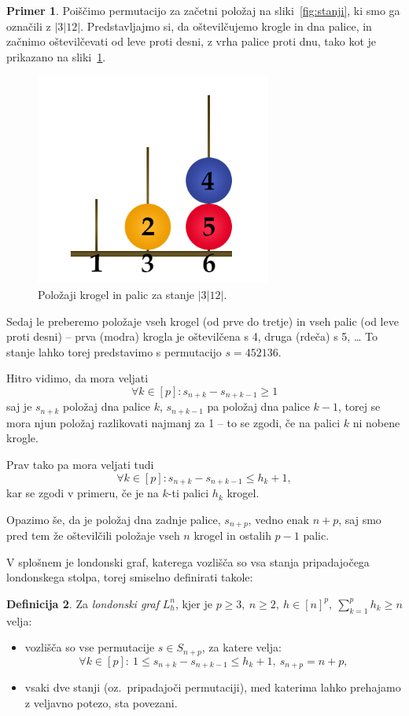 \documentclass[12pt,a4paper]{amsart}
\theoremstyle{definition} %
\newtheorem{definicija}{Definicija}[section]
\newtheorem{primer}[definicija]{Primer}
\theoremstyle{plain} %
\begin{document}
\begin{primer}
    Poiščimo permutacijo za začetni položaj na sliki~\ref{fig:stanji}, ki smo ga označili z $|3|12|$. 
    Predstavljajmo si, da oštevilčujemo krogle in dna palice, in začnimo oštevilčevati od leve proti desni, z vrha palice proti dnu, tako kot je prikazano na sliki~\ref{fig:ostev-stanji}.
    
    \begin{figure}[h]
        \includegraphics[width=220pt]{img/london-tower-numbered.png}
        \caption{Položaji krogel in palic za stanje $|3|12|$.}
        \label{fig:ostev-stanji}
    \end{figure}
    
    Sedaj le preberemo položaje vseh krogel (od prve do tretje) in vseh palic (od leve proti desni) -- prva (modra) krogla je oštevilčena s 4, druga (rdeča) s 5, \ldots
    To stanje lahko torej predstavimo s permutacijo $s=452136$.
\end{primer}

Hitro vidimo, da mora veljati 
\[\forall k \in [p]\colon s_{n+k} - s_{n+k-1} \geq 1 \]
saj je $s_{n+k}$ položaj dna palice $k$, $s_{n+k-1}$ pa položaj dna palice $k-1$, torej se mora njun položaj razlikovati najmanj za 1 -- to se zgodi, če na palici $k$ ni nobene krogle.

Prav tako pa mora veljati tudi 
\[\forall k \in [p]\colon s_{n+k} - s_{n+k-1} \leq h_k + 1,\]
kar se zgodi v primeru, če je na $k$-ti palici $h_k$ krogel.

Opazimo še, da je položaj dna zadnje palice, $s_{n+p}$, vedno enak $n+p$, saj smo pred tem že oštevilčili položaje vseh $n$ krogel in ostalih $p-1$ palic.

V splošnem je londonski graf, katerega vozlišča so vsa stanja pripadajočega londonskega stolpa, torej smiselno definirati takole:

\begin{definicija}
    Za \emph{londonski graf} $L_h^n$, kjer je $p \geq 3,\ n \geq 2,\ h \in [n]^p,\  \sum_{k=1}^p h_k \geq n$ velja:
    \begin{itemize}
        \item vozlišča so vse permutacije $s \in S_{n+p}$, za katere velja:
        \[\forall k \in [p]:\ 1 \leq s_{n+k} - s_{n+k-1} \leq h_k + 1,\ s_{n+p} = n + p ,\]
        \item vsaki dve stanji (oz.\ pripadajoči permutaciji), med katerima lahko prehajamo z veljavno potezo, sta povezani.
    \end{itemize}
\end{definicija}
\end{document}
